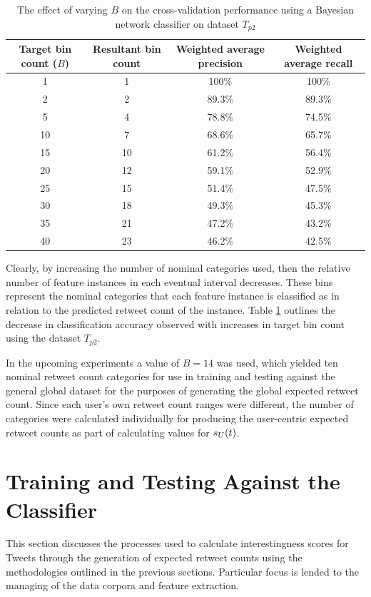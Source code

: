 \begin{table}[h]\footnotesize
\begin{center}
\begin{tabular}{ c | c | c | c }
	Target bin count ($B$)	& Resultant bin count & Weighted average precision &  Weighted average recall \\
	\hline
	\hline 
    1 & 1 & 100\% & 100\% \\
    2 & 2 & 89.3\% & 89.3\% \\
    5 & 4 & 78.8\%  & 74.5\% \\
    10 & 7 & 68.6\% & 65.7\% \\
    15 & 10 & 61.2\% & 56.4\% \\
    20 & 12 & 59.1\% & 52.9\% \\
    25 & 15 & 51.4\% & 47.5\% \\
    30 & 18 & 49.3\% & 45.3\% \\
    35 & 21 & 47.2\% & 43.2\% \\
    40 & 23 & 46.2\% & 42.5\% \\
    \hline  
\end{tabular}
\end{center}
\caption{The effect of varying $B$ on the cross-validation performance using a Bayesian network classifier on dataset $T_{p2}$}
\label{table:binperformance}
\end{table}

Clearly, by increasing the number of nominal categories used, then the relative number of feature instances in each eventual interval decreases. These bins represent the nominal categories that each feature instance is classified as in relation to the predicted retweet count of the instance. Table \ref{table:binperformance} outlines the decrease in classification accuracy observed with increases in target bin count using the dataset $T_{p2}$.

In the upcoming experiments a value of $B = 14$ was used, which yielded ten nominal retweet count categories for use in training and testing against the general global dataset for the purposes of generating the global expected retweet count. Since each user's own retweet count ranges were different, the number of categories were calculated individually for producing the user-centric expected retweet counts as part of calculating values for $s_U(t)$.


\section{Training and Testing Against the Classifier}
This section discusses the processes used to calculate interestingness scores for Tweets through the generation of expected retweet counts using the methodologies outlined in the previous sections. Particular focus is lended to the managing of the data corpora and feature extraction.


